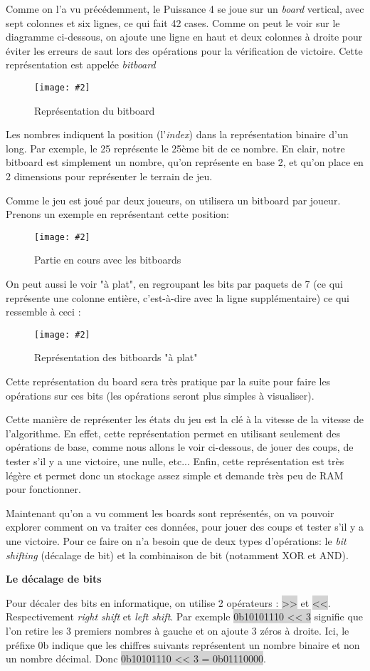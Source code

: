 \documentclass[a4paper]{article}
\newcommand{\img}[3][]{
    \begin{figure}[H]
        \centering
        \texttt{[image: \#2]}
        \caption{#1}    
    \end{figure}
}
\newcommand{\inlinecode}[1]{\colorbox{lightgray}{#1}}
\newcommand{\ptitle}[1]{\vspace{10pt}
{\large \noindent \textbf{#1}}}
\begin{document}
    Comme on l'a vu précédemment, le Puissance 4 se joue sur un \textit{board} vertical, avec sept colonnes et six lignes, ce qui fait 42 cases. Comme on peut le voir sur le diagramme ci-dessous, on ajoute une ligne en haut et deux colonnes à droite pour éviter les erreurs de saut lors des opérations pour la vérification de victoire. Cette représentation est appelée \textit{bitboard}
    \img[Représentation du bitboard]{Images/BitBoard.png}{0.7}
    Les nombres indiquent la position (l'\textit{index}) dans la représentation binaire d'un long. Par exemple, le 25 représente le 25ème bit de ce nombre. En clair, notre bitboard est simplement un nombre, qu'on représente en base 2, et qu'on place en 2 dimensions pour représenter le terrain de jeu.

    Comme le jeu est joué par deux joueurs, on utilisera un bitboard par joueur.
    Prenons un exemple en représentant cette position:
    \img[Partie en cours avec les bitboards]{Images/ExempleBitBoardsPt2.png}{0.7}
    On peut aussi le voir "à plat", en regroupant les bits par paquets de 7 (ce qui représente une colonne entière, c'est-à-dire avec la ligne supplémentaire) ce qui ressemble à ceci :
    \img[Représentation des bitboards "à plat"]{Images/FlatBiboard.png}{1}
    Cette représentation du board sera très pratique par la suite pour faire les opérations sur ces bits (les opérations seront plus simples à visualiser).

    Cette manière de représenter les états du jeu est la clé à la vitesse de la vitesse de l'algorithme. En effet, cette représentation permet en utilisant seulement des opérations de base, comme nous allons le voir ci-dessous, de jouer des coups, de tester s'il y a une victoire, une nulle, etc... Enfin, cette représentation est très légère et permet donc un stockage assez simple et demande très peu de RAM pour fonctionner.

    Maintenant qu'on a vu comment les boards sont représentés, on va pouvoir explorer comment on va traiter ces données, pour jouer des coups et tester s'il y a une victoire. Pour ce faire on n'a besoin que de deux types d'opérations: le \textit{bit shifting} (décalage de bit) et la combinaison de bit (notamment XOR et AND).

    \ptitle{Le décalage de bits}

    Pour décaler des bits en informatique, on utilise 2 opérateurs : \inlinecode{>>} et \inlinecode{<<}. Respectivement \textit{right shift} et \textit{left shift}. Par exemple \inlinecode{0b10101110 << 3} signifie que l'on retire les 3 premiers nombres à gauche et on ajoute 3 zéros à droite. Ici, le préfixe 0b indique que les chiffres suivants représentent un nombre binaire et non un nombre décimal. Donc \inlinecode{0b10101110 << 3 = 0b01110000}.
   
\end{document}
